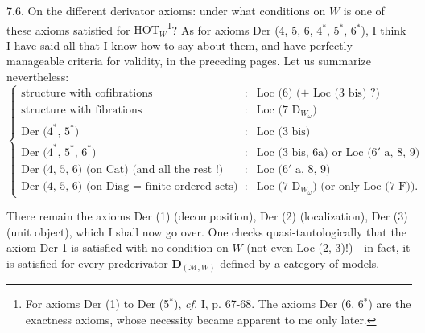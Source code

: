 \documentclass[11pt]{article}
\newcommand{\printedpage}[1]{\marginpar{\footnotesize p.~#1}}
\newcommand{\msp}[1]{\marginpar{\footnotesize [#1]}}
\begin{document}
\printedpage{52}
7.6. On the different derivator axioms: under what conditions on $W$ is one of these axioms satisfied for $\mathrm{HOT}_W$\footnote[51]{For axioms Der (1) to Der (5$^*$), \textit{cf.} I, p. 67-68. The axioms Der (6, 6$^*$) are the exactness axioms, whose necessity became apparent to me only later.}? As for axioms Der (4, 5, 6, 4$^*$, 5$^*$, 6$^*$), I think I have said all that I know how to say about them, and have perfectly manageable criteria for validity, in the preceding pages. Let us summarize nevertheless: %
\[
\left\{
\begin{array}{lcl}
\text{structure with cofibrations} & : & \text{Loc (6) (+ Loc (3 bis) ?)} \\[1ex]
\text{structure with fibrations} & : & \text{Loc (7 }\mathrm{D}_{W_\omega}\text{)} \\[1ex]
\text{Der (4}^*\text{, 5}^*\text{)} & : & \text{Loc (3 bis)} \\[1ex]
\text{Der (4}^*\text{, 5}^*\text{, 6}^*\text{)} & : & \text{Loc (3 bis, 6a) or Loc (6}'\text{ a, 8, 9)} \\[1ex]
\text{Der (4, 5, 6) (on Cat) (and all the rest !)} & : & \text{Loc (6}'\text{ a, 8, 9)} \\[1ex]
\text{Der (4, 5, 6) (on Diag $=$ finite ordered sets)} & : & \text{Loc (7 }\mathrm{D}_{W_\omega}\text{) (or only Loc (7 F)).}
\end{array}
\right.
\]

There remain the axioms Der (1) (decomposition), Der (2) (localization), Der (3) (unit object), which I shall now go over. One checks
\msp{page 109}
quasi-tautologically that the axiom Der 1 is satisfied with no condition on $W$ (not even Loc (2, 3)!) - in fact, it is satisfied for every prederivator $\mathbf{D}_{(\mathcal{M},W)}$ defined by a category of models.
\end{document}
